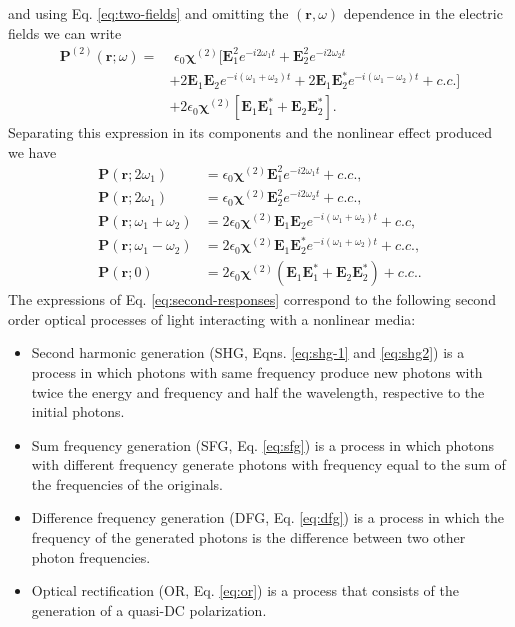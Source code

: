 and using Eq. \eqref{eq:two-fields} and omitting the $(\mathbf{r},\omega)$
dependence in the electric fields we can write
\begin{equation}
\begin{aligned}
\mathbf{P}^{(2)} (\mathbf{r};\omega) 
= &\,\,
\epsilon_{0} \boldsymbol{\chi}^{(2)}
[ \mathbf{E}_{1}^2 e^{-i2\omega_{1}t} + 
\mathbf{E}_{2}^{2} e^{-i2\omega_{2}t} 
\\
&+
2\mathbf{E}_{1}\mathbf{E}_{2} e^{-i(\omega_{1} + \omega_{2})t} + 
2\mathbf{E}_{1}\mathbf{E}_{2}^{*} e^{-i(\omega_{1} - \omega_{2})t} + c.c. ] \\
&+
2 \epsilon_{0} \boldsymbol{\chi}^{(2)} 
[ \mathbf{E}_{1}\mathbf{E}_{1}^{*} + \mathbf{E}_{2}\mathbf{E}_{2}^{*} ]
.
\end{aligned}
\end{equation}
Separating this expression in its components and the nonlinear effect produced
we have
\begin{subequations}
\begin{align}
\mathbf{P}(\mathbf{r};2\omega_{1}) &= \epsilon_{0} 
\boldsymbol{\chi}^{(2)} \mathbf{E}_{1}^{2} e^{-i2\omega_{1}t} +c.c., 
\label{eq:shg-1}
\\
\mathbf{P}(\mathbf{r};2\omega_{1}) &= \epsilon_{0} 
\boldsymbol{\chi}^{(2)} \mathbf{E}_{2}^{2} e^{-i2\omega_{2}t} +c.c.,
\label{eq:shg2}
\\
\mathbf{P}(\mathbf{r};\omega_{1} + \omega_{2}) &= 2\epsilon_{0}
\boldsymbol{\chi}^{(2)} \mathbf{E}_{1} 
\mathbf{E}_{2} e^{-i(\omega_{1}+\omega_{2})t} +c.c, 
\label{eq:sfg}
\\
\mathbf{P}(\mathbf{r};\omega_{1} - \omega_{2}) &= 2\epsilon_{0}
\boldsymbol{\chi}^{(2)} \mathbf{E}_{1} 
\mathbf{E}_{2}^{*} e^{-i(\omega_{1}+\omega_{2})t} +c.c.,
\label{eq:dfg}
\\
\mathbf{P}(\mathbf{r};0) &= 2\epsilon_{0}
\boldsymbol{\chi}^{(2)} (\mathbf{E}_{1}\mathbf{E}_{1}^{*} + 
\mathbf{E}_{2}\mathbf{E}_{2}^{*}) + c.c..
\label{eq:or}
\end{align}
\label{eq:second-responses}
\end{subequations}
The expressions of Eq. \eqref{eq:second-responses} correspond to the following
second order optical processes of light interacting with a nonlinear media:
\begin{itemize}\itemsep0pt
    \item Second harmonic generation (SHG, Eqns. \ref{eq:shg-1} and
    \ref{eq:shg2}) is a process in which photons with same frequency produce
    new photons with twice the energy and frequency and half the wavelength,
    respective to the initial photons.
    \item Sum frequency generation (SFG, Eq. \ref{eq:sfg}) is a process in
    which photons with different frequency generate photons with frequency
    equal to the sum of the frequencies of the originals.
    \item Difference frequency generation (DFG, Eq. \ref{eq:dfg}) is a
    process in which the frequency of the generated photons is the difference
    between two other photon frequencies.
    \item Optical rectification (OR, Eq. \ref{eq:or}) is a process that
    consists of the generation of a quasi-DC polarization.
\end{itemize}
